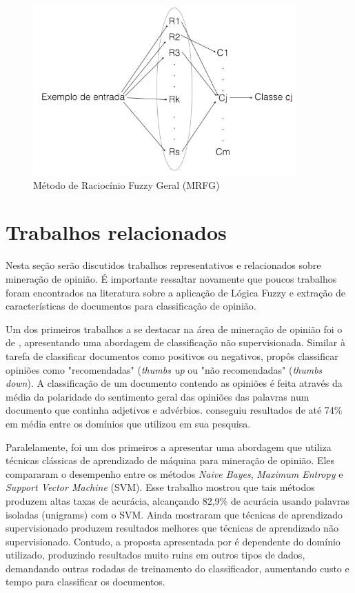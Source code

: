 \documentclass[template.tex]{subfiles}
\begin{document}
\begin{figure}[H]  
  \caption{Método de Raciocínio Fuzzy Geral (MRFG)}
  \label{fig:mrfg}
  \centering
    \includegraphics[width=0.9\textwidth]{mrfg}
\end{figure}

\section{Trabalhos relacionados}

Nesta seção serão discutidos trabalhos representativos e relacionados sobre mineração de opinião. É importante ressaltar novamente que poucos trabalhos foram encontrados na literatura sobre a aplicação de Lógica Fuzzy e extração de características de documentos para classificação de opinião. 

Um dos primeiros trabalhos a se destacar na área de mineração de opinião foi o de , apresentando uma abordagem de classificação não supervisionada. Similar à tarefa de classificar documentos como positivos ou negativos,  propôs classificar opiniões como "recomendadas" (\textit{thumbs up} ou "não recomendadas" (\textit{thumbs down}). A classificação de um documento contendo as opiniões é feita através da média da polaridade do sentimento geral das opiniões das palavras num documento que continha adjetivos e advérbios.  conseguiu resultados de até 74\% em média entre os domínios que utilizou em sua pesquisa.

Paralelamente,  foi um dos primeiros a apresentar uma abordagem que utiliza técnicas clássicas de aprendizado de máquina para mineração de opinião. Eles compararam o desempenho entre os métodos \textit{Naive Bayes}, \textit{Maximum Entropy} e \textit{Support Vector Machine} (SVM). Esse trabalho mostrou que tais métodos produzem altas taxas de acurácia, alcançando 82,9\% de acurácia usando palavras isoladas (unigrams) com o SVM. Ainda mostraram que técnicas de aprendizado supervisionado produzem resultados melhores que técnicas de aprendizado não supervisionado. Contudo, a proposta apresentada por  é dependente do domínio utilizado, produzindo resultados muito ruins em outros tipos de dados, demandando outras rodadas de treinamento do classificador, aumentando custo e tempo para classificar os documentos.
\end{document}

